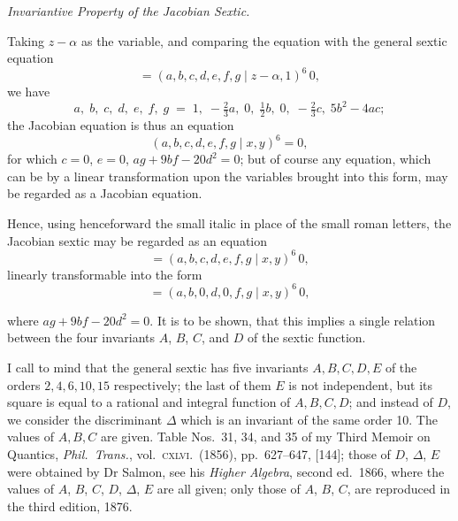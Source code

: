 \documentclass[11pt]{article}
\begin{document}
\bigskip

\begin{center}
\textit{Invariantive Property of the Jacobian Sextic.}
\end{center}

\medskip\noindent
Taking $z-\alpha$ as the variable, and comparing the equation with
the general sextic equation
\[
  =(a,b,c,d,e,f,g\mid z-\alpha,1)^{6}\,0,
\]
we have
\[
  a,\;b,\;c,\;d,\;e,\;f,\;g\;=\;1,\;-\tfrac{2}{3}a,\;0,\;\tfrac{1}{2}b,\;0,\;-\tfrac{2}{3}c,\;5b^{2}-4ac;
\]
the Jacobian equation is thus an equation
\[
  (a,b,c,d,e,f,g\mid x,y)^{6}=0,
\]
for which $c=0$, $e=0$, $ag+9bf-20d^{2}=0$; but of course any
equation, which can be by a linear transformation upon the
variables brought into this form, may be regarded as a Jacobian
equation.

\medskip
Hence, using henceforward the small italic in place of the small
roman letters, the Jacobian sextic may be regarded as an equation
\[
  =(a,b,c,d,e,f,g\mid x,y)^{6}\,0,
\]
linearly transformable into the form
\[
  =(a,b,0,d,0,f,g\mid x,y)^{6}\,0,
\]

\newpage
\noindent
where $ag+9bf-20d^{2}=0$.  It is to be shown, that this implies a
single relation between the four invariants $A$, $B$, $C$, and $D$
of the sextic function.

\medskip
I call to mind that the general sextic has five invariants
$A,B,C,D,E$ of the orders $2,4,6,10,15$ respectively; the last of
them $E$ is not independent, but its square is equal to a rational
and integral function of $A,B,C,D$; and instead of $D$, we consider
the discriminant $\Delta$ which is an invariant of the same order
10.  The values of $A,B,C$ are given.  Table Nos.\ 31, 34, and 35 of
my Third Memoir on Quantics, \textit{Phil.\ Trans.}, vol.\
\textsc{cxlvi}.\ (1856), pp.\ 627--647, [144]; those of $D$,
$\Delta$, $E$ were obtained by Dr Salmon, see his \textit{Higher
Algebra}, second ed.\ 1866, where the values of $A$, $B$, $C$, $D$,
$\Delta$, $E$ are all given; only those of $A$, $B$, $C$, are
reproduced in the third edition, 1876.
\end{document}
